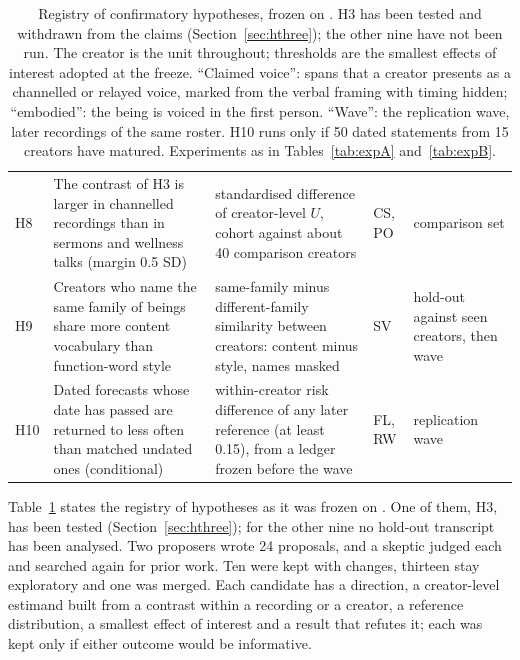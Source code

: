 \documentclass[letterpaper]{article} %
\newcommand{\expid}[1]{\textsc{#1}}
\begin{document}
\begin{table}[t]
\begin{tabular}{@{}l>{\raggedright\arraybackslash}p{}>{\raggedright\arraybackslash}p{}>{\raggedright\arraybackslash}p{}>{\raggedright\arraybackslash}p{}@{}}
H8 & The contrast of H3 is larger in channelled recordings than in sermons and wellness talks (margin 0.5 SD) & standardised difference of creator-level $U$, cohort against about 40 comparison creators & \expid{CS}, \expid{PO} & comparison set \\
H9 & Creators who name the same family of beings share more content vocabulary than function-word style & same-family minus different-family similarity between creators: content minus style, names masked & \expid{SV} & hold-out against seen creators, then wave \\
H10 & Dated forecasts whose date has passed are returned to less often than matched undated ones (conditional) & within-creator risk difference of any later reference (at least 0.15), from a ledger frozen before the wave & \expid{FL}, \expid{RW} & replication wave \\
\bottomrule
\end{tabular}
\caption{Registry of confirmatory hypotheses, frozen on \RegistryFrozenDate. H3 has been tested and withdrawn from the claims (Section~\ref{sec:hthree}); the other nine have not been run. The creator is the unit throughout; thresholds are the smallest effects of interest adopted at the freeze. ``Claimed voice'': spans that a creator presents as a channelled or relayed voice, marked from the verbal framing with timing hidden; ``embodied'': the being is voiced in the first person. ``Wave'': the replication wave, later recordings of the same roster. H10 runs only if 50 dated statements from 15 creators have matured. Experiments as in Tables~\ref{tab:expA} and~\ref{tab:expB}.}
\label{tab:hypotheses}
\end{table}

Table~\ref{tab:hypotheses} states the registry of \NMaxConfirmatory{} hypotheses as it was frozen on \RegistryFrozenDate. One of them, H3, has been tested (Section~\ref{sec:hthree}); for the other nine no hold-out transcript has been analysed. Two proposers wrote 24 proposals, and a skeptic judged each and searched again for prior work. Ten were kept with changes, thirteen stay exploratory and one was merged. Each candidate has a direction, a creator-level estimand built from a contrast within a recording or a creator, a reference distribution, a smallest effect of interest and a result that refutes it; each was kept only if either outcome would be informative.
\end{document}
